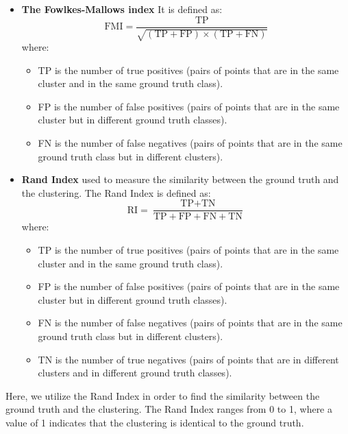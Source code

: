 \documentclass{article}
\begin{document}
\begin{itemize}
    \item \textbf{The Fowlkes-Mallows index}
    It is defined as:
    \begin{equation}
        \text{FMI} = \frac{\text{TP}}{\sqrt{(\text{TP} + \text{FP}) \times (\text{TP} + \text{FN})}}
    \end{equation}
    where:
    \begin{itemize}
        \item TP is the number of true positives (pairs of points that are in the same cluster and in the same ground truth class).
        \item FP is the number of false positives (pairs of points that are in the same cluster but in different ground truth classes).
        \item FN is the number of false negatives (pairs of points that are in the same ground truth class but in different clusters).
    \end{itemize}
    \cite{fowlkes_mallows_wiki}
    \item \textbf{Rand Index}
    used to measure the similarity between the ground truth and the clustering. The Rand Index is defined as:
    \begin{equation}
        \text{RI} = \frac{\text{TP} + \text{TN}}{\text{TP} + \text{FP} + \text{FN} + \text{TN}}
    \end{equation}
    where:
    \begin{itemize}
        \item TP is the number of true positives (pairs of points that are in the same cluster and in the same ground truth class).
        \item FP is the number of false positives (pairs of points that are in the same cluster but in different ground truth classes).
        \item FN is the number of false negatives (pairs of points that are in the same ground truth class but in different clusters).
        \item TN is the number of true negatives (pairs of points that are in different clusters and in different ground truth classes).
    \end{itemize}
    \cite{rand_index_wiki}
\end{itemize}

Here, we utilize the Rand Index in order to find the similarity between the ground truth and the clustering. The Rand Index ranges from 0 to 1, where a value of 1 indicates that the clustering is identical to the ground truth.
\end{document}
